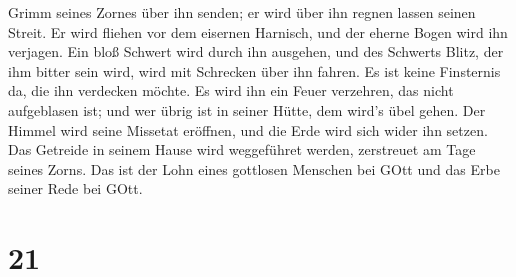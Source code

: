 Grimm seines Zornes über ihn senden; er wird über ihn regnen lassen
seinen Streit.  Er wird fliehen vor dem eisernen Harnisch,
und der eherne Bogen wird ihn verjagen.  Ein bloß Schwert
wird durch ihn ausgehen, und des Schwerts Blitz, der ihm bitter sein
wird, wird mit Schrecken über ihn fahren.  Es ist keine
Finsternis da, die ihn verdecken möchte. Es wird ihn ein Feuer
verzehren, das nicht aufgeblasen ist; und wer übrig ist in seiner Hütte,
dem wird's übel gehen.  Der Himmel wird seine Missetat
eröffnen, und die Erde wird sich wider ihn setzen.  Das
Getreide in seinem Hause wird weggeführet werden, zerstreuet am Tage
seines Zorns.  Das ist der Lohn eines gottlosen Menschen
bei GOtt und das Erbe seiner Rede bei GOtt.

\hypertarget{section-20}{%
\section{21}\label{section-20}}

